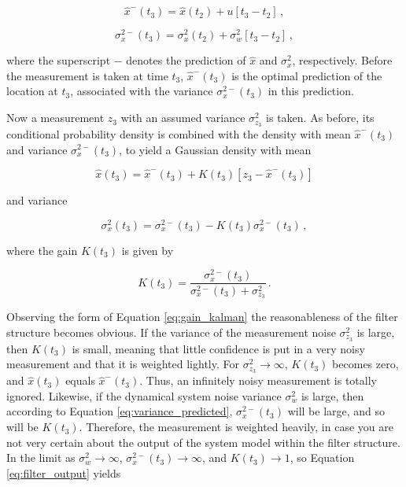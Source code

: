 \begin{equation}\label{eq:system_model}
  \hat{x}^-(t_3)=\hat{x}(t_2)+u[t_3-t_2]\,,
\end{equation}

\begin{equation}\label{eq:variance_predicted}
  \sigma^{2-}_x(t_3)=\sigma^2_x(t_2)+\sigma^2_w[t_3-t_2]\,,
\end{equation}

\noindent
where the superscript $-$ denotes the prediction of $\hat{x}$ and $\sigma^{2}_x$, respectively. Before the measurement is taken at time $t_3$, $\hat{x}^-(t_3)$ is the optimal prediction of the location at $t_3$, associated with the variance $\sigma^{2-}_x(t_3)$ in this prediction.

Now a measurement $z_3$ with an assumed variance $\sigma^2_{z_3}$ is taken. As before, its conditional probability density is combined with the density with mean $\hat{x}^-(t_3)$ and variance $\sigma^{2-}_x(t_3)$, to yield a Gaussian density with mean

\begin{equation}\label{eq:estimation_kalman}
  \hat{x}(t_3) = \hat{x}^-(t_3) + K(t_3)[z_3-\hat{x}^-(t_3)]
\end{equation}

\noindent
and variance

\begin{equation}\label{eq:variance_kalman}
  \sigma^2_x(t_3) = \sigma^{2-}_x(t_3)-K(t_3)\sigma^{2-}_x(t_3)\,,
\end{equation}

\noindent
where the gain $K(t_3)$ is given by

\begin{equation}\label{eq:gain_kalman}
  K(t_3) = \frac{\sigma^{2-}_x(t_3)}{\sigma^{2-}_x(t_3)+\sigma^2_{z_3}}\,.
\end{equation}

Observing the form of Equation \ref{eq:gain_kalman} the reasonableness of the filter structure becomes obvious. If the variance of the measurement noise $\sigma^2_{z_3}$ is large, then $K(t_3)$ is small, meaning that little confidence is put in a very noisy measurement and that it is weighted lightly. For $\sigma^2_{z_3}\rightarrow\infty$, $K(t_3)$ becomes zero, and $\hat{x}(t_3)$ equals $\hat{x}^-(t_3)$. Thus, an infinitely noisy measurement is totally ignored. Likewise, if the dynamical system noise variance $\sigma^2_w$ is large, then according to Equation \ref{eq:variance_predicted}, $\sigma^{2-}_x(t_3)$ will be large, and so will be $K(t_3)$. Therefore, the measurement is weighted heavily, in case you are not very certain about the output of the system model within the filter structure. In the limit as $\sigma^2_w \rightarrow\infty$, $\sigma^{2-}_x(t_3) \rightarrow\infty$, and $K(t_3) \rightarrow1$, so Equation \ref{eq:filter_output} yields

